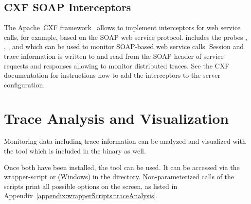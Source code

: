 \subsection{CXF SOAP Interceptors}\label{sec:traceAnalysis:instr:cxf}

The Apache~CXF framework~\cite{CXF-WebSite} allows to implement interceptors for web service calls, %
for example, based on the SOAP web service protocol. %
\Kieker{} includes the probes %
, %
, %
, and %
 which can be used to %
monitor SOAP-based web service calls. %
Session and trace information is written to and read from the SOAP header of %
service requests and responses allowing to monitor distributed traces. %
See the CXF documentation for instructions how to add the interceptors %
to the server configuration.

\pagebreak

\section{Trace Analysis and Visualization}\label{sec:traceAnalysisTool}


Monitoring data including trace information can be analyzed and visualized with the \KiekerTraceAnalysis{} tool which is included in the \Kieker{} binary as well.\\

 \vspace{3mm}

\noindent Once both have been installed, the \KiekerTraceAnalysis{} tool can be used. It can be accessed via the wrapper-script  or  (Windows) in the  directory. Non-parameterized calls of the scripts print all possible options on the screen, as listed in Appendix~\ref{appendix:wrapperScripts:traceAnalysis}.

